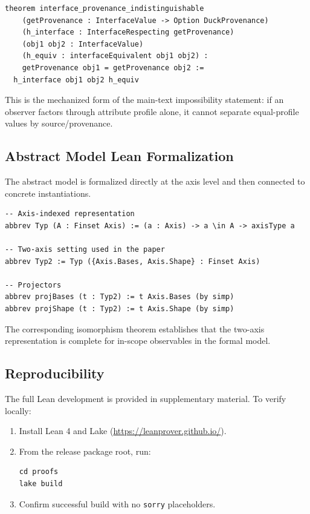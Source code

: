 \begin{lstlisting}[style=lean]
theorem interface_provenance_indistinguishable
    (getProvenance : InterfaceValue -> Option DuckProvenance)
    (h_interface : InterfaceRespecting getProvenance)
    (obj1 obj2 : InterfaceValue)
    (h_equiv : interfaceEquivalent obj1 obj2) :
    getProvenance obj1 = getProvenance obj2 :=
  h_interface obj1 obj2 h_equiv
\end{lstlisting}

This is the mechanized form of the main-text impossibility statement: if an observer factors through attribute profile alone, it cannot separate equal-profile values by source/provenance.

\subsection{Abstract Model Lean Formalization}\label{abstract-model-lean-formalization}

The abstract model is formalized directly at the axis level and then connected to concrete instantiations.

\begin{lstlisting}[style=lean]
-- Axis-indexed representation
abbrev Typ (A : Finset Axis) := (a : Axis) -> a \in A -> axisType a

-- Two-axis setting used in the paper
abbrev Typ2 := Typ ({Axis.Bases, Axis.Shape} : Finset Axis)

-- Projectors
abbrev projBases (t : Typ2) := t Axis.Bases (by simp)
abbrev projShape (t : Typ2) := t Axis.Shape (by simp)
\end{lstlisting}

The corresponding isomorphism theorem establishes that the two-axis representation is complete for in-scope observables in the formal model.

\subsection{Reproducibility}

The full Lean development is provided in supplementary material. To verify locally:
\begin{enumerate}
\item Install Lean 4 and Lake (\url{https://leanprover.github.io/}).
\item From the release package root, run:
\begin{lstlisting}[style=lean]
cd proofs
lake build
\end{lstlisting}
\item Confirm successful build with no \texttt{sorry} placeholders.
\end{enumerate}
